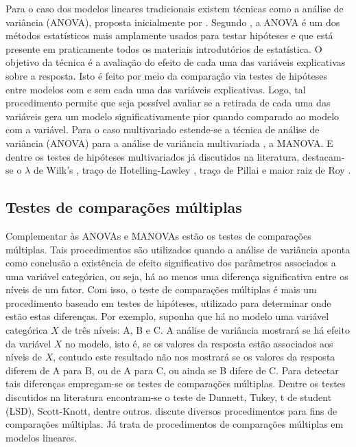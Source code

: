 \documentclass[AMA,STIX1COL]{WileyNJD-v2}
\begin{document}
Para o caso dos modelos lineares tradicionais existem técnicas como a análise de variância (ANOVA), proposta inicialmente por \cite{anova_fisher}. Segundo \cite{anova1}, a ANOVA é um dos métodos estatísticos mais amplamente usados para testar hipóteses e que está presente em praticamente todos os materiais introdutórios de estatística. O objetivo da técnica é a avaliação do efeito de cada uma das variáveis explicativas sobre a resposta. Isto é feito por meio da comparação via testes de hipóteses entre modelos com e sem cada uma das variáveis explicativas. Logo, tal procedimento permite que seja possível avaliar se a retirada de cada uma das variáveis gera um modelo significativamente pior quando comparado ao modelo com a variável. Para o caso multivariado estende-se a técnica de análise de variância (ANOVA) para a análise de variância  multivariada \citep{manova}, a MANOVA. E dentre os testes de hipóteses multivariados já discutidos na literatura, destacam-se o $\lambda$ de Wilk's \cite{wilks}, traço de Hotelling-Lawley \cite{lawley,hotelling}, traço de Pillai \cite{pillai} e maior raiz de Roy \cite{roy}. 

\subsection{Testes de comparações múltiplas}

Complementar às ANOVAs e MANOVAs estão os testes de comparações múltiplas. Tais procedimentos são utilizados quando a análise de variância aponta como conclusão a existência de efeito significativo dos parâmetros associados a uma variável categórica, ou seja, há ao menos uma diferença significativa entre os níveis de um fator. Com isso, o teste de comparações múltiplas é mais um procedimento baseado em testes de hipóteses, utilizado para determinar onde estão estas diferenças. Por exemplo, suponha que há no modelo uma variável categórica $X$ de três níveis: A, B e C. A análise de variância mostrará se há efeito da variável $X$ no modelo, isto é, se os valores da resposta estão associados aos níveis de $X$, contudo este resultado não nos mostrará se os valores da resposta diferem de A para B, ou de A para C, ou ainda se B difere de C. Para detectar tais diferenças empregam-se os testes de comparações múltiplas. Dentre os testes discutidos na literatura encontram-se o teste de Dunnett, Tukey, t de student (LSD), Scott-Knott, dentre outros. \cite{hsu1996multiple} discute diversos procedimentos para fins de comparações múltiplas. Já \cite{bretz2008multiple} trata de procedimentos de comparações múltiplas em modelos lineares.
\end{document}
